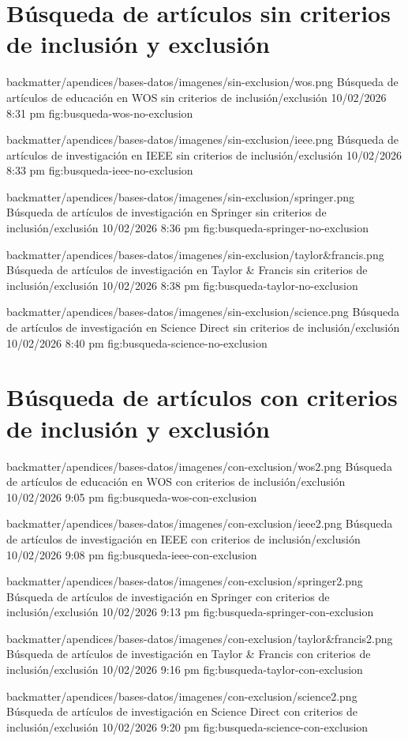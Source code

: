 
\section{Búsqueda de artículos sin criterios de inclusión y exclusión}
\label{sec:busqueda-sin-criterios}

\dbfigure
{backmatter/apendices/bases-datos/imagenes/sin-exclusion/wos.png}
{Búsqueda de artículos de educación en WOS sin criterios de inclusión/exclusión}
{10/02/2026 8:31 pm}
{fig:busqueda-wos-no-exclusion}

\dbfigure
{backmatter/apendices/bases-datos/imagenes/sin-exclusion/ieee.png}
{Búsqueda de artículos de investigación en IEEE sin criterios de inclusión/exclusión}
{10/02/2026 8:33 pm}
{fig:busqueda-ieee-no-exclusion}

\dbfigure
{backmatter/apendices/bases-datos/imagenes/sin-exclusion/springer.png}
{Búsqueda de artículos de investigación en Springer sin criterios de inclusión/exclusión}
{10/02/2026 8:36 pm}
{fig:busqueda-springer-no-exclusion}

\dbfigure
{backmatter/apendices/bases-datos/imagenes/sin-exclusion/taylor&francis.png}
{Búsqueda de artículos de investigación en Taylor \& Francis sin criterios de inclusión/exclusión}
{10/02/2026 8:38 pm}
{fig:busqueda-taylor-no-exclusion}

\dbfigure
{backmatter/apendices/bases-datos/imagenes/sin-exclusion/science.png}
{Búsqueda de artículos de investigación en Science Direct sin criterios de inclusión/exclusión}
{10/02/2026 8:40 pm}
{fig:busqueda-science-no-exclusion}


\section{Búsqueda de artículos con criterios de inclusión y exclusión}
\label{sec:busqueda-con-criterios}

\dbfigure
{backmatter/apendices/bases-datos/imagenes/con-exclusion/wos2.png}
{Búsqueda de artículos de educación en WOS con criterios de inclusión/exclusión}
{10/02/2026 9:05 pm}
{fig:busqueda-wos-con-exclusion}

\dbfigure
{backmatter/apendices/bases-datos/imagenes/con-exclusion/ieee2.png}
{Búsqueda de artículos de investigación en IEEE con criterios de inclusión/exclusión}
{10/02/2026 9:08 pm}
{fig:busqueda-ieee-con-exclusion}

\dbfigure
{backmatter/apendices/bases-datos/imagenes/con-exclusion/springer2.png}
{Búsqueda de artículos de investigación en Springer con criterios de inclusión/exclusión}
{10/02/2026 9:13 pm}
{fig:busqueda-springer-con-exclusion}

\dbfigure
{backmatter/apendices/bases-datos/imagenes/con-exclusion/taylor&francis2.png}
{Búsqueda de artículos de investigación en Taylor \& Francis con criterios de inclusión/exclusión}
{10/02/2026 9:16 pm}
{fig:busqueda-taylor-con-exclusion}

\dbfigure
{backmatter/apendices/bases-datos/imagenes/con-exclusion/science2.png}
{Búsqueda de artículos de investigación en Science Direct con criterios de inclusión/exclusión}
{10/02/2026 9:20 pm}
{fig:busqueda-science-con-exclusion}
